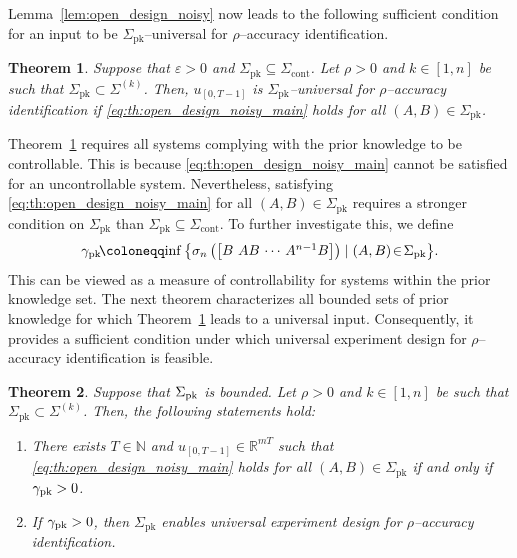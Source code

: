 \documentclass[journal,twoside,web]{ieeecolor}
\newcommand{\set}[2]{\left\{#1 \mid #2\right\}}
\newtheorem{theorem}{Theorem}
\begin{document}
Lemma~\ref{lem:open_design_noisy} now leads to the following sufficient condition for an input to be $\Sigma_\text{pk}$--universal for \mbox{$\rho$--accuracy} identification. 

\begin{theorem}
\label{th:open_design_noisy}
Suppose that $\varepsilon>0$ and $\Sigma_\text{pk}\subseteq\Sigma_\text{cont}$. Let $\rho>0$ and $k\in[1,n]$ be such that $\Sigma_\text{pk}\subset\Sigma^{(k)}$. Then, $u_{[0,T-1]}$ is $\Sigma_\text{pk}$--universal for $\rho$--accuracy identification if \eqref{eq:th:open_design_noisy_main} holds for all $(A,B)\in\Sigma_\text{pk}$. 
\end{theorem}

Theorem~\ref{th:open_design_noisy} requires all systems complying with the prior knowledge to be controllable. This is because \eqref{eq:th:open_design_noisy_main} cannot be satisfied for an uncontrollable system. Nevertheless, satisfying \eqref{eq:th:open_design_noisy_main} for all $(A,B)\in\Sigma_\text{pk}$ requires a stronger condition on $\Sigma_\text{pk}$ than $\Sigma_\text{pk}\subseteq\Sigma_\text{cont}$. To further investigate this, we define
\begin{equation}
\label{eq:gamma_def}
\gamma_\textup{pk}\!\coloneqq\! \inf\set{\sigma_n\left(\begin{bmatrix}
B \!\!&\!\! AB \!\!&\!\! \cdots \!\!&\!\! A^{n-1}B
\end{bmatrix}\right)}{(A,B)\!\in\!\Sigma_\textup{pk}}\!.
\end{equation}
This can be viewed as a measure of controllability for systems within the prior knowledge set. The next theorem characterizes all bounded sets of prior knowledge for which Theorem~\ref{th:open_design_noisy} leads to a universal input. Consequently, it provides a sufficient condition under which universal experiment design for \mbox{$\rho$--accuracy} identification is feasible. 

\begin{theorem}
\label{th:open_enabling_noisy}
Suppose that $\Sigma_\textup{pk}$ is bounded. Let $\rho>0$ and $k\in[1,n]$ be such that $\Sigma_\text{pk}\subset\Sigma^{(k)}$. Then, the following statements hold:
\begin{enumerate}[label=(\alph*),ref=\ref{th:open_enabling_noisy}(\alph*)]
    \item\label{th:open_enabling_noisy(a)} There exists $T\in\mathbb{N}$ and $u_{[0,T-1]}\in\mathbb{R}^{mT}$ such that \eqref{eq:th:open_design_noisy_main} holds for all $(A,B)\in\Sigma_\text{pk}$ \emph{if and only if} $\gamma_\textup{pk}>0$.
    \item\label{th:open_enabling_noisy(b)} If $\gamma_\textup{pk}>0$, then $\Sigma_\text{pk}$ enables universal experiment design for $\rho$--accuracy identification.
\end{enumerate}
\end{theorem}
\end{document}
